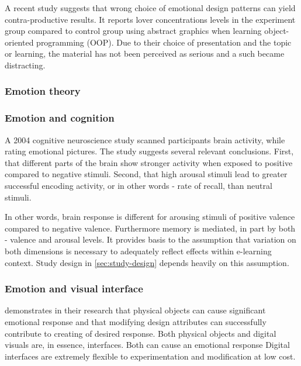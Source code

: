 	A recent study \cite{Haaranen2015} suggests that wrong choice of emotional design patterns can yield contra-productive results. It reports lover concentrations levels in the experiment group compared to control group using abstract graphics when learning object-oriented programming (OOP). Due to their choice of presentation and the topic or learning, the material has not been perceived as serious and a such became distracting.
		
		\subsubsection{Emotion theory}
		
		
		\subsubsection{Emotion and cognition} \label{sec:emotion-cognition}
		
		A 2004 cognitive neuroscience study \cite{Dolcos2004} scanned participants brain activity, while rating emotional pictures. The study suggests several relevant conclusions. First, that different parts of the brain show stronger activity when exposed to positive compared to negative stimuli. Second, that high arousal stimuli lead to greater successful encoding activity, or in other words - rate of recall, than neutral stimuli. 
		
		In other words, brain response is different for arousing stimuli of positive valence compared to negative valence. Furthermore memory is mediated, in part by both - valence and arousal levels. It provides basis to the assumption that variation on both dimensions is necessary to adequately reflect effects within e-learning context. Study design in \ref{sec:study-design} depends heavily on this assumption.
		
		\subsubsection{Emotion and visual interface}
		
		\cite{Desmet2007} demonstrates in their research that physical objects can cause significant emotional response and that modifying design attributes can successfully contribute to creating of desired response.
		Both physical objects and digital visuals are, in essence, interfaces. Both can cause an emotional response \citationneeded Digital interfaces are extremely flexible to experimentation and modification at low cost.
	
